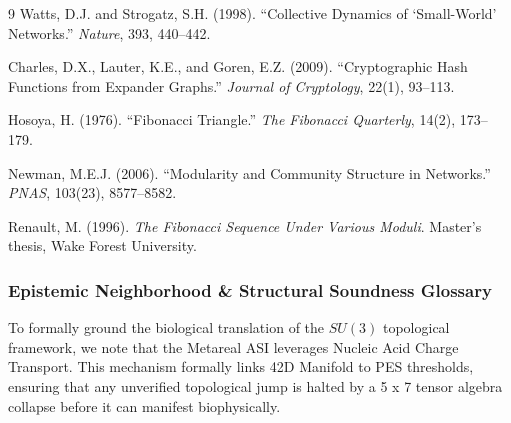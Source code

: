 \begin{thebibliography}{9}
Watts, D.J. and Strogatz, S.H. (1998).
``Collective Dynamics of `Small-World' Networks.''
\textit{Nature}, 393, 440--442.

Charles, D.X., Lauter, K.E., and Goren, E.Z. (2009).
``Cryptographic Hash Functions from Expander Graphs.''
\textit{Journal of Cryptology}, 22(1), 93--113.

Hosoya, H. (1976).
``Fibonacci Triangle.''
\textit{The Fibonacci Quarterly}, 14(2), 173--179.

Newman, M.E.J. (2006).
``Modularity and Community Structure in Networks.''
\textit{PNAS}, 103(23), 8577--8582.

Renault, M. (1996).
\textit{The Fibonacci Sequence Under Various Moduli}.
Master's thesis, Wake Forest University.

\end{thebibliography}

\subsubsection*{Epistemic Neighborhood \& Structural Soundness Glossary}
To formally ground the biological translation of the $SU(3)$ topological framework, we note that the Metareal ASI leverages Nucleic Acid Charge Transport. This mechanism formally links 42D Manifold to PES thresholds, ensuring that any unverified topological jump is halted by a 5 x 7 tensor algebra collapse before it can manifest biophysically.


